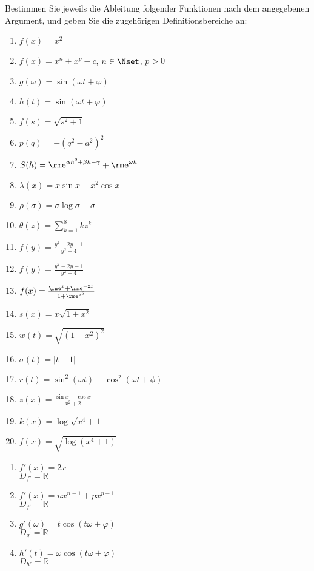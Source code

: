 \documentclass[11pt,answers]{exam}
\begin{document}
\begin{questions}
Bestimmen Sie jeweils die Ableitung folgender Funktionen nach dem angegebenen Argument, und geben Sie die zugehörigen Definitionsbereiche an:\\
\parbox{0.5\textwidth}{\begin{enumerate}
\item $f(x)=x^2$
\item $f(x)=x^n+x^p-c$, $n\in\Nset$, $p>0$
\item $g(\omega)=\sin(\omega t+\varphi)$
\item $h(t)=\sin(\omega t+\varphi)$
\item $f(s)=\sqrt{s^2+1}$
\item $p(q)=-(q^2-a^2)^2$
\item $S(h)=\rme^{\alpha h^2+\beta h-\gamma}+\rme^{\omega h}$
\item $\lambda(x)=x\sin x+x^2\cos x$
\item $\rho(\sigma)=\sigma\log\sigma-\sigma$
\item $\theta(z)=\sum_{k=1}^8 k z^k$
\end{enumerate}}\parbox{0.5\textwidth}{\begin{enumerate}\setcounter{enumi}{10}
\item $f(y)=\frac{y^2-2y-1}{y^2+4}$
\item $f(y)=\frac{y^2-2y-1}{y^2-4}$
\item $f(x)=\frac{\rme^x+\rme^{-2x}}{1+\rme^{x^2}}$
\item $s(x)=x\sqrt{1+x^2}$
\item $w(t)=\sqrt{\left(1-x^2\right)^2}$
\item $\sigma(t)=|t+1|$
\item $r(t)=\sin^2(\omega t)+\cos^2(\omega t+\phi)$
\item $z(x)=\frac{\sin x-\cos x}{x^2+2}$
\item $k(x)=\log\sqrt{x^4+1}$
\item $f(x)=\sqrt{\log(x^4+1)}$
\end{enumerate}}
\begin{solution}
\begin{enumerate}
\item $f'(x)=2x$\\ $D_{f'}=\mathbb{R}$
\item $f'(x)=n x^{n-1}+p x^{p-1}$\\ $D_{f'}=\mathbb{R}$
\item $g'(\omega)=t \cos (t \omega +\varphi )$\\ $D_{g'}=\mathbb{R}$
\item $h'(t)=\omega  \cos (t \omega +\varphi )$\\ $D_{h'}=\mathbb{R}$

\end{enumerate}
\end{solution}
\end{questions}
\end{document}
